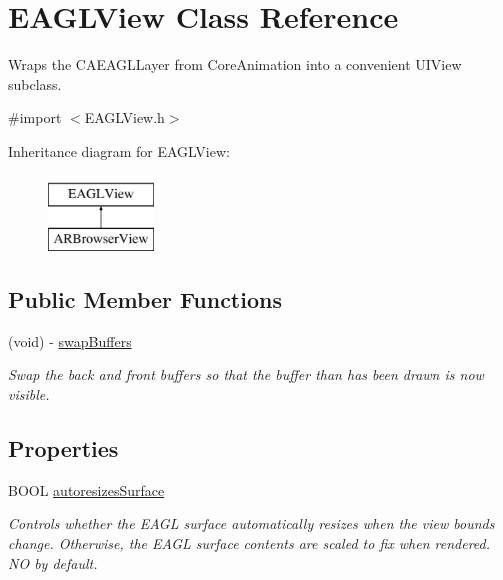 \hypertarget{interface_e_a_g_l_view}{
\section{EAGLView Class Reference}
\label{interface_e_a_g_l_view}
}


Wraps the CAEAGLLayer from CoreAnimation into a convenient UIView subclass.  




{\ttfamily \#import $<$EAGLView.h$>$}

Inheritance diagram for EAGLView:\begin{figure}[H]
\begin{center}
\leavevmode
\includegraphics[height=2.000000cm]{interface_e_a_g_l_view}
\end{center}
\end{figure}
\subsection*{Public Member Functions}
\begin{DoxyCompactItemize}
\item 
(void) -\/ \hyperlink{interface_e_a_g_l_view_a9e6bb4e8a5bb54ecffb384abcc154504}{swapBuffers}
\begin{DoxyCompactList}\small\item\em Swap the back and front buffers so that the buffer than has been drawn is now visible. \end{DoxyCompactList}\end{DoxyCompactItemize}
\subsection*{Properties}
\begin{DoxyCompactItemize}
\item 
\hypertarget{interface_e_a_g_l_view_a40b2efdb8bd6e5dd3ad25e9947f8d98c}{
BOOL \hyperlink{interface_e_a_g_l_view_a40b2efdb8bd6e5dd3ad25e9947f8d98c}{autoresizesSurface}}
\label{interface_e_a_g_l_view_a40b2efdb8bd6e5dd3ad25e9947f8d98c}

\begin{DoxyCompactList}\small\item\em Controls whether the EAGL surface automatically resizes when the view bounds change. Otherwise, the EAGL surface contents are scaled to fix when rendered. NO by default. \end{DoxyCompactList}\end{DoxyCompactItemize}


